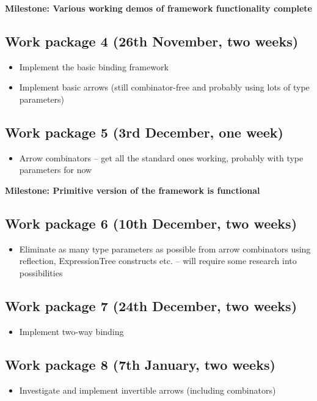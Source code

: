 \documentclass[12pt,a4]{article}
\begin{document}
	\noindent \textbf{Milestone: Various working demos of framework functionality complete}
	
	\subsection{Work package 4 (26th November, two weeks)}
		\begin{itemize}
			\item Implement the basic binding framework
			\item Implement basic arrows (still combinator-free and probably using lots of type parameters)
		\end{itemize}
	
	\subsection{Work package 5 (3rd December, one week)}
		\begin{itemize}
			\item Arrow combinators -- get all the standard ones working, probably with type parameters for now
		\end{itemize}
	
	\noindent \textbf{Milestone: Primitive version of the framework is functional}
	
	\subsection{Work package 6 (10th December, two weeks)}
		\begin{itemize}
			\item Eliminate as many type parameters as possible from arrow combinators using reflection, ExpressionTree constructs etc. -- will require some research into possibilities
		\end{itemize}
	
	\subsection{Work package 7 (24th December, two weeks)}
		\begin{itemize}
			\item Implement two-way binding
		\end{itemize}
	
	\subsection{Work package 8 (7th January, two weeks)}
		\begin{itemize}
			\item Investigate and implement invertible arrows (including combinators)
		\end{itemize}
	
\end{document}
